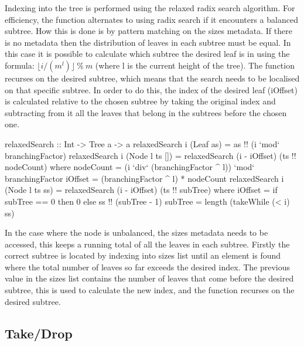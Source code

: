 \documentclass[11pt,a4paper,oneside]{article}
\begin{document}
Indexing into the tree is performed using the relaxed radix search algorithm. For efficiency, the function alternates to using radix search if it encounters a balanced subtree. How this is done is by pattern matching on the sizes metadata. If there is no metadata then the distribution of leaves in each subtree must be equal. In this case it is possible to calculate which subtree the desired leaf is in using the formula: $\lfloor i / (m^l) \rfloor\  \%\  m$ (where l is the current height of the tree). The function recurses on the desired subtree, which means that the search needs to be localised on that specific subtree. In order to do this, the index of the desired leaf (iOffset) is calculated relative to the chosen subtree by taking the original index and subtracting from it all the leaves that belong in the subtrees before the chosen one. 

\begin{haskell}

relaxedSearch :: Int -> Tree a -> a 
relaxedSearch i (Leaf as) = as !! (i `mod` branchingFactor)
relaxedSearch i (Node l ts [])  = relaxedSearch (i - iOffset) (ts !! nodeCount) 
                where nodeCount = (i `div` (branchingFactor ^ l)) `mod` branchingFactor
                      iOffset   = (branchingFactor ^ l) * nodeCount
relaxedSearch i (Node l ts ss)  = relaxedSearch (i - iOffset) (ts !! subTree)
                where iOffset   = if subTree == 0 then 0 else ss !! (subTree - 1) 
                      subTree   = length (takeWhile (< i) ss) 

\end{haskell}

In the case where the node is unbalanced, the sizes metadata needs to be accessed, this keeps a running total of all the leaves in each subtree. Firstly the correct subtree is located by indexing into sizes list until an element is found where the total number of leaves so far exceeds the desired index. The previous value in the sizes list contains the number of leaves that come before the desired subtree, this is used to calculate the new index, and the function recurses on the desired subtree.

\subsection*{Take/Drop}

\begin{haskell}



\end{haskell}
\end{document}
